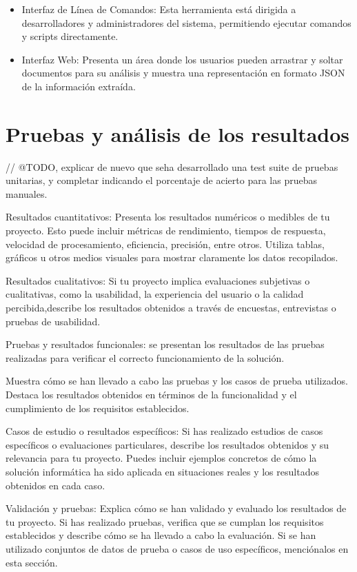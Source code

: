 \begin{itemize}
    \item Interfaz de Línea de Comandos: Esta herramienta está dirigida a desarrolladores y
    administradores del sistema, permitiendo ejecutar comandos y scripts directamente.


    \item Interfaz Web: Presenta un área donde los usuarios pueden
    arrastrar y soltar documentos para su análisis y muestra una representación en formato JSON de la información
    extraída.
\end{itemize}


\section{Pruebas y análisis de los resultados}

// @TODO, explicar de nuevo que seha desarrollado una test suite de pruebas unitarias, y
completar indicando el porcentaje de acierto para las pruebas manuales.

Resultados cuantitativos: Presenta los resultados numéricos o medibles de tu
proyecto.
Esto puede incluir métricas de rendimiento, tiempos de respuesta, velocidad de procesamiento, eficiencia,
precisión, entre otros.
Utiliza tablas, gráficos u otros medios visuales para mostrar claramente los datos recopilados.

Resultados cualitativos: Si tu proyecto implica evaluaciones subjetivas o cualitativas, como la usabilidad, la
experiencia del usuario o la calidad percibida,describe los resultados obtenidos a través de encuestas, entrevistas o
pruebas de usabilidad.

Pruebas y resultados funcionales: se presentan los resultados de las pruebas realizadas para verificar el correcto
funcionamiento de la solución.

Muestra cómo se han llevado a cabo las pruebas y los casos de prueba utilizados.
Destaca los resultados obtenidos en términos de la funcionalidad y el cumplimiento de los requisitos establecidos.

Casos de estudio o resultados específicos: Si has realizado estudios de casos específicos o evaluaciones particulares,
describe los resultados obtenidos y su relevancia para tu proyecto.
Puedes incluir ejemplos concretos de cómo la solución informática ha sido aplicada en situaciones reales y los
resultados obtenidos en cada caso.

Validación y pruebas: Explica cómo se han validado y evaluado los resultados de tu proyecto.
Si has realizado pruebas, verifica que se cumplan los requisitos establecidos y describe cómo se ha llevado a cabo la
evaluación.
Si se han utilizado conjuntos de datos de prueba o casos de uso específicos, menciónalos en esta sección.

